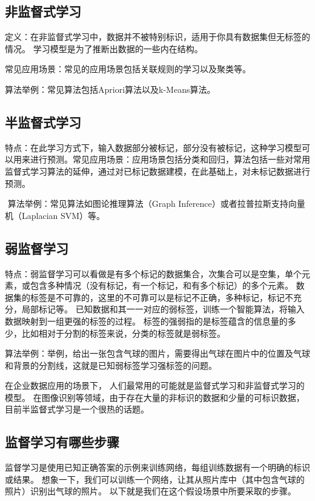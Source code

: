 \subsection{非监督式学习}
\label{ux975eux76d1ux7763ux5f0fux5b66ux4e60}
定义：在非监督式学习中，数据并不被特别标识，适用于你具有数据集但无标签的情况。
学习模型是为了推断出数据的一些内在结构。

常见应用场景：常见的应用场景包括关联规则的学习以及聚类等。

​算法举例：常见算法包括Apriori算法以及k-Means算法。

\subsection{半监督式学习}
\label{ux534aux76d1ux7763ux5f0fux5b66ux4e60}
特点：在此学习方式下，输入数据部分被标记，部分没有被标记，这种学习模型可以用来进行预测。
​
常见应用场景：应用场景包括分类和回归，算法包括一些对常用监督式学习算法的延伸，通过对已标记数据建模，在此基础上，对未标记数据进行预测。

​ 算法举例：常见算法如图论推理算法（Graph Inference）或者拉普拉斯支持向量机（Laplacian SVM）等。
\subsection{弱监督学习}
\label{ux5f31ux76d1ux7763ux5b66ux4e60}
特点：弱监督学习可以看做是有多个标记的数据集合，次集合可以是空集，单个元素，或包含多种情况（没有标记，有一个标记，和有多个标记）的多个元素。
数据集的标签是不可靠的，这里的不可靠可以是标记不正确，多种标记，标记不充分，局部标记等。
已知数据和其一一对应的弱标签，训练一个智能算法，将输入数据映射到一组更强的标签的过程。
标签的强弱指的是标签蕴含的信息量的多少，比如相对于分割的标签来说，分类的标签就是弱标签。

算法举例：举例，给出一张包含气球的图片，需要得出气球在图片中的位置及气球和背景的分割线，这就是已知弱标签学习强标签的问题。

​在企业数据应用的场景下，
人们最常用的可能就是监督式学习和非监督式学习的模型。
在图像识别等领域，由于存在大量的非标识的数据和少量的可标识数据，目前半监督式学习是一个很热的话题。

\subsection{监督学习有哪些步骤}
\label{ux76d1ux7763ux5b66ux4e60ux6709ux54eaux4e9bux6b65ux9aa4}

监督学习是使用已知正确答案的示例来训练网络，每组训练数据有一个明确的标识或结果。
想象一下，我们可以训练一个网络，让其从照片库中（其中包含气球的照片）识别出气球的照片。
以下就是我们在这个假设场景中所要采取的步骤。

